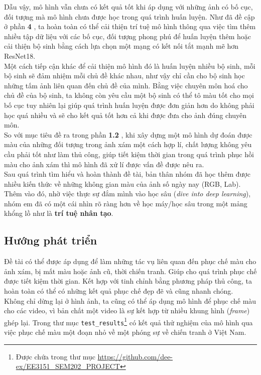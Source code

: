 \documentclass[a4paper]{article}
\begin{document}
\noindent
Dẫu vậy, mô hình vẫn chưa có kết quả tốt khi áp dụng với những ảnh có bố cục, đối tượng mà mô hình chưa được học trong quá trình huấn luyện. Như đã đề cập ở phần \textbf{4 }, ta hoàn toàn có thể cải thiện trí tuệ mô hình thông qua việc tìm thêm nhiều tập dữ liệu với các bố cục, đối tượng phong phú để huấn luyện thêm hoặc cải thiện bộ sinh bằng cách lựa chọn một mạng có kết nối tắt mạnh mẽ hơn ResNet18.\\
Một cách tiếp cận khác để cải thiện mô hình đó là huấn luyện nhiều bộ sinh, mỗi bộ sinh sẽ đảm nhiệm mỗi chủ đề khác nhau, như vậy chỉ cần cho bộ sinh học những tấm ảnh liên quan đến chủ đề của mình. Bằng việc chuyên môn hoá cho chủ đề của bộ sinh, ta không còn yêu cầu một bộ sinh có thể tô màu tốt cho mọi bố cục tuy nhiên lại giúp quá trình huấn luyện được đơn giản hơn do không phải học quá nhiều và sẽ cho kết quả tốt hơn cả khi được đưa cho ảnh đúng chuyên môn.\\

\noindent
So với mục tiêu đề ra trong phần \textbf{1.2 }, khi xây dựng một mô hình dự đoán được màu của những đối tượng trong ảnh xám một cách hợp lí, chất lượng không yêu cầu phải tốt như làm thủ công, giúp tiết kiệm thời gian trong quá trình phục hồi màu cho ảnh xám thì mô hình đã xử lí được vấn đề được nêu ra.\\

\noindent
Sau quá trình tìm hiểu và hoàn thành đề tài, bản thân nhóm đã học thêm được nhiều kiến thức về những không gian màu của ảnh số ngày nay (RGB, Lab). Thêm vào đó, nhờ việc thực sự đắm mình vào học sâu (\textit{dive into deep learning}), nhóm em đã có một cái nhìn rõ ràng hơn về học máy/học sâu trong một mảng khổng lồ như là \textbf{trí tuệ nhân tạo}.

\subsection{Hướng phát triển}
Đề tài có thể được áp dụng để làm những tác vụ liên quan đến phục chế màu cho ảnh xám, bị mất màu hoặc ảnh cũ, thời chiến tranh. Giúp cho quá trình phục chế được tiết kiệm thời gian. Kết hợp với tinh chỉnh bằng phương pháp thủ công, ta hoàn toàn có thể có những kết quả phục chế đẹp đẽ và cũng nhanh chóng.\\

\noindent
Không chỉ dừng lại ở hình ảnh, ta cũng có thể áp dụng mô hình để phục chế màu cho các video, vì bản chất một video là sự kết hợp từ nhiều khung hình (\textit{frame}) ghép lại. Trong thư mục \texttt{test\_results}\footnote{Được chứa trong thư mục \href{https://github.com/dee-ex/EE3151\_SEM202\_PROJECT}{https://github.com/dee-ex/EE3151\_SEM202\_PROJECT}} có kết quả thử nghiệm của mô hình qua việc phục chế màu một đoạn nhỏ về một phóng sự về chiến tranh ở Việt Nam.
\end{document}
